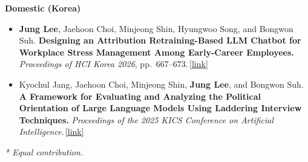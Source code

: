 \documentclass[letterpaper,10pt]{article}
\newcommand{\pub}[1]{\,\href{#1}{\small [link]}}
\newenvironment{plain}
  {\begin{itemize}[leftmargin=1.2em, itemsep=\PLAINSEP, parsep=0pt, topsep=\TOPSEP]}
  {\end{itemize}}
\newcommand{\me}{\textbf{Jung Lee}}   %
\begin{document}
\textbf{Domestic (Korea)}
\begin{plain}

  \item \me, Jaehoon Choi, Minjeong Shin, Hyungwoo Song, and Bongwon Suh.
        \textbf{Designing an Attribution Retraining-Based LLM Chatbot for Workplace Stress
        Management Among Early-Career Employees.} \textit{Proceedings of HCI Korea 2026}, pp.~667--673.\pub{https://www.dbpia.co.kr/journal/articleDetail?nodeId=NODE12745858}

  \item Kyochul Jang, Jaehoon Choi, Minjeong Shin, \me, and Bongwon Suh.
        \textbf{A Framework for Evaluating and Analyzing the Political Orientation of Large
        Language Models Using Laddering Interview Techniques.} \textit{Proceedings of the 2025 KICS
        Conference on Artificial Intelligence}.\pub{https://scholar.google.com/scholar?oi=bibs\&cluster=6252816665032242407\&btnI=1\&hl=ko}
\end{plain}
\vspace{0.3em}
{\small\textit{* Equal contribution.}}

\end{document}
